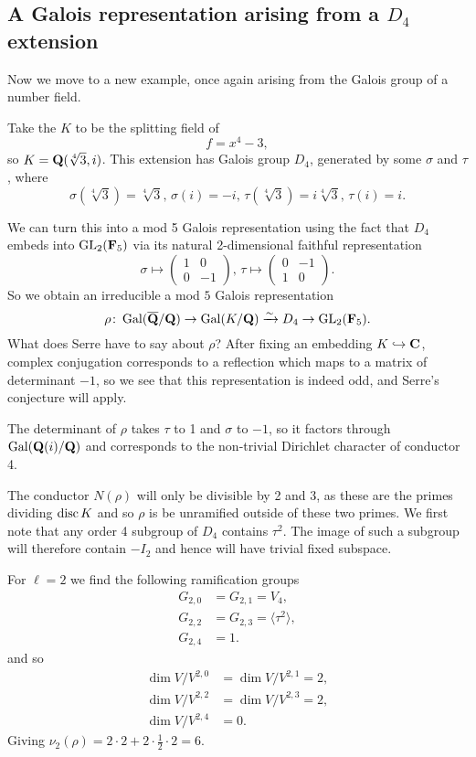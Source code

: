 \documentclass[a4paper,12pt]{article}
\begin{document}
\subsection{A Galois representation arising from a $D_4$ extension}
Now we move to a new example, once again arising from the Galois group of a number field.

\begin{ex}
Take the $K$ to be the splitting field of
\[
f = x^4 - 3,
\]
so $K = \mathbf{Q}(\sqrt[4]{3},i)$.
This extension has Galois group $D_4$, generated by some $\sigma$ and $\tau$, where
\[
\sigma(\sqrt[4]{3}) = \sqrt[4]{3},\,\sigma(i) = -i,\,
\tau(\sqrt[4]{3}) = i\sqrt[4]{3},\,\tau(i) = i.
\]

We can turn this into a mod 5 Galois representation using the fact that $D_4$ embeds into $\operatorname{GL}_2(\mathbf{F}_5)$ via its natural 2-dimensional faithful representation
\[
\sigma \mapsto \begin{pmatrix} 1 & 0 \\ 0 & -1 \end{pmatrix},\,
\tau \mapsto \begin{pmatrix} 0 & -1 \\ 1 & 0 \end{pmatrix}.
\]
So we obtain an irreducible a mod $5$ Galois representation
\[
\rho\colon \operatorname{Gal}(\overline{\mathbf{Q}}/\mathbf{Q}) \to \operatorname{Gal}(K/\mathbf{Q}) \xrightarrow{\sim} D_4  \to \operatorname{GL}_2(\mathbf{F}_5).
\]
What does Serre have to say about $\rho$?
After fixing an embedding $K \hookrightarrow \mathbf{C}$, complex conjugation corresponds to a reflection which maps to a matrix of determinant $-1$, so we see that this representation is indeed odd, and Serre's conjecture will apply.

The determinant of $\rho$ takes $\tau$ to 1 and $\sigma$ to $-1$, so it factors through $\operatorname{Gal}(\mathbf{Q}(i)/\mathbf{Q})$ and corresponds to the non-trivial Dirichlet character of conductor 4.

The conductor $N(\rho)$ will only be divisible by 2 and 3, as these are the primes dividing $\operatorname{disc} K$ and so $\rho$ is be unramified outside of these two primes.
We first note that any order 4 subgroup of $D_4$ contains $\tau^2$.
The image of such a subgroup will therefore contain $-I_2$ and hence will have trivial fixed subspace.

For $\ell = 2$ we find the following ramification groups
\begin{align*}
G_{2,0}&= G_{2,1}= V_4,\\
G_{2,2}&= G_{2,3} = \langle \tau^2\rangle,\\
G_{2,4}&= 1.
\end{align*}
and so
\begin{align*}
\dim V/V^{2,0} &= \dim V/V^{2,1} = 2,\\
\dim V/V^{2,2} &= \dim V/V^{2,3} = 2,\\
\dim V/V^{2,4} &= 0.
\end{align*}
Giving $\nu_2(\rho) = 2 \cdot 2 + 2\cdot \frac{1}{2} \cdot 2 = 6$.


\end{ex}
\end{document}
